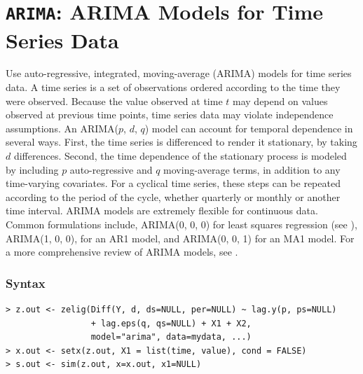 

\usepackage{Sweave}

\nobibliography*
\nobibliography*

\section{{\tt ARIMA}: ARIMA Models for Time Series Data}
\label{ARIMA} 

Use auto-regressive, integrated, moving-average (ARIMA) models for
time series data.  A time series is a set of observations ordered
according to the time they were observed.  Because the value observed
at time $t$ may depend on values observed at previous time points,
time series data may violate independence assumptions.  An ARIMA($p$,
$d$, $q$) model can account for temporal dependence in several ways.
First, the time series is differenced to render it stationary, by
taking $d$ differences.  Second, the time dependence of the stationary
process is modeled by including $p$ auto-regressive and $q$
moving-average terms, in addition to any time-varying covariates.  For
a cyclical time series, these steps can be repeated according to the
period of the cycle, whether quarterly or monthly or another time
interval.  ARIMA models are extremely flexible for continuous data.
Common formulations include, ARIMA(0, 0, 0) for least squares
regression (see ), ARIMA(1, 0, 0), for an AR1 model, and
ARIMA(0, 0, 1) for an MA1 model.  For a more comprehensive review of
ARIMA models, see \cite{Enders04}.

\subsubsection*{Syntax}
\begin{verbatim}
> z.out <- zelig(Diff(Y, d, ds=NULL, per=NULL) ~ lag.y(p, ps=NULL) 
                 + lag.eps(q, qs=NULL) + X1 + X2, 
                 model="arima", data=mydata, ...)
> x.out <- setx(z.out, X1 = list(time, value), cond = FALSE) 
> s.out <- sim(z.out, x=x.out, x1=NULL)
\end{verbatim}

